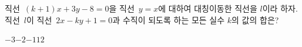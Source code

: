 직선~$(k+1)x+3y-8=0$을 직선~$y=x$에 대하여 대칭이동한 직선을 $l$이라 하자. 직선~$l$이 직선~$2x-ky+1=0$과 수직이 되도록 하는 모든 실수 $k$의 값의 합은?
\begin{choices32}{$-3$}{$-2$}{$-1$}{$1$}{$2$}\end{choices32}
